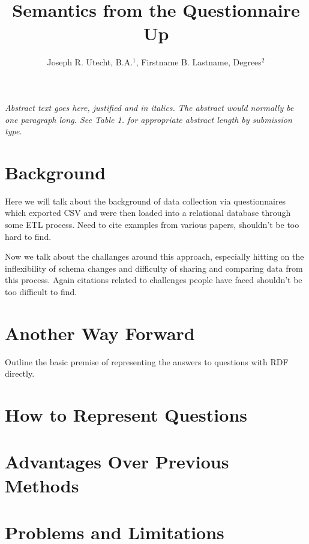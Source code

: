 \documentclass{amia}
\begin{document}
\title{Semantics from the Questionnaire Up}

\author{Joseph R. Utecht, B.A.$^{1}$, Firstname B. Lastname, Degrees$^{2}$}


\maketitle


\textit{Abstract text goes here, justified and in italics.  The abstract would normally be one paragraph long.  See Table 1. for appropriate abstract length by submission type.}

\section*{Background}
Here we will talk about the background of data collection via questionnaires which exported CSV and were then loaded into a relational database through some ETL process.  Need to cite examples from various papers, shouldn't be too hard to find.

Now we talk about the challanges around this approach, especially hitting on the inflexibility of schema changes and difficulty of sharing and comparing data from this process. Again citations related to challenges people have faced shouldn't be too difficult to find.

\section*{Another Way Forward}
Outline the basic premise of representing the answers to questions with RDF directly.

\section*{How to Represent Questions}

\section*{Advantages Over Previous Methods}

\section*{Problems and Limitations}
\end{document}
